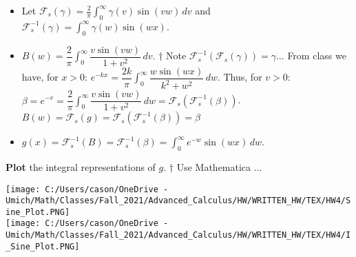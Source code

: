 \documentclass[10pt]{article}
\begin{document}
\begin{itemize}
    \item Let $ \displaystyle \mathcal{F}_s(\gamma) = \frac{2}{\pi} \int_{0}^{\infty} \gamma(v) \sin(vw) \,dv $ and $ \displaystyle \mathcal{F}_s^{-1}(\gamma) = \int_{0}^{\infty} \gamma(w) \sin(wx) $. \\
    \item $ \displaystyle B(w) = \dfrac{2}{\pi} \int_{0}^{\infty} \dfrac{v\sin(vw)}{1 + v^2} \,dv $. $ \dagger $ Note $ \mathcal{F}_s^{-1}(\mathcal{F}_s(\gamma)) = \gamma \dots $ 
    \subitem From class we have, for $ x > 0 $: $ \displaystyle e^{-kx} = \dfrac{2k}{\pi} \int_{0}^{\infty} \dfrac{w \sin(wx)}{k^2 + w^2} \,dw $.
    \subitem Thus, for $ v > 0 $: $ \displaystyle \beta = e^{-v} = \dfrac{2}{\pi} \int_{0}^{\infty} \dfrac{v \sin(vw)}{1 + v^2} \,dw = \mathcal{F}_s(\mathcal{F}_s^{-1}(\beta)) $.
    \subitem $ \displaystyle B(w) = \mathcal{F}_s(g) = \mathcal{F}_s(\mathcal{F}_s^{-1}(\beta)) = \beta $
    \item $ \displaystyle g(x) = \mathcal{F}_s^{-1}(B) = \mathcal{F}_s^{-1}(\beta) = \int_{0}^{\infty} e^{-w} \sin(wx) \,dw $. \\
\end{itemize}

\noindent
\textbf{Plot} the integral representations of $ g $. $ \dagger $ Use Mathematica $ \dots $ \\

\begin{center}
    \texttt{[image: C:/Users/cason/OneDrive - Umich/Math/Classes/Fall\_2021/Advanced\_Calculus/HW/WRITTEN\_HW/TEX/HW4/Sine\_Plot.PNG]} \\
    \texttt{[image: C:/Users/cason/OneDrive - Umich/Math/Classes/Fall\_2021/Advanced\_Calculus/HW/WRITTEN\_HW/TEX/HW4/I\_Sine\_Plot.PNG]} \\
\end{center}
\end{document}
